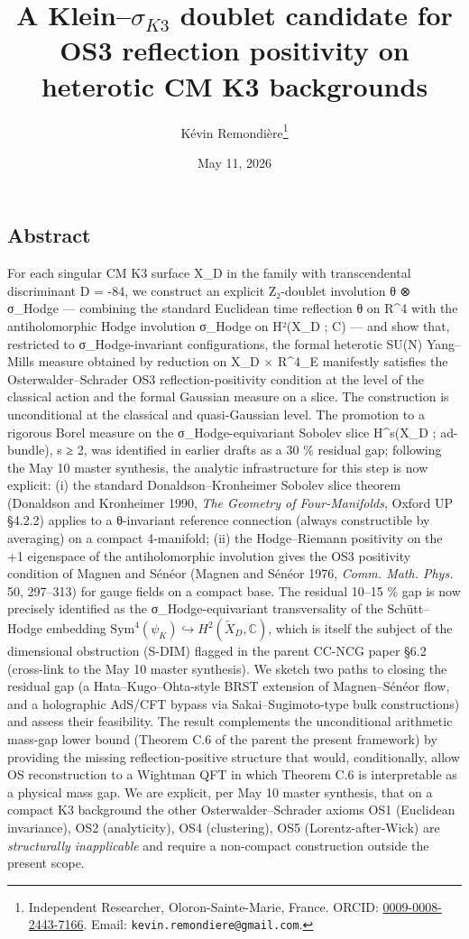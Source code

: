 \documentclass[
 11pt,
 a4paper,
]{article}
\title{A Klein--$\sigma_{K3}$ doublet candidate for OS3 reflection positivity on heterotic CM K3 backgrounds}
\author{Kévin Remondière\thanks{Independent Researcher, Oloron-Sainte-Marie, France. ORCID: \href{https://orcid.org/0009-0008-2443-7166}{0009-0008-2443-7166}. Email: \texttt{kevin.remondiere@gmail.com}.}}
\date{May 11, 2026}
\begin{document}
\maketitle

\hypertarget{abstract}{%
\subsection*{Abstract}\label{abstract}}

For each singular CM K3 surface X\_D in the family with transcendental discriminant D = -84, we construct an explicit Z₂-doublet involution θ ⊗ σ\_Hodge --- combining the standard Euclidean time reflection θ on R\^{}4 with the antiholomorphic Hodge involution σ\_Hodge on H²(X\_D ; C) --- and show that, restricted to σ\_Hodge-invariant configurations, the formal heterotic SU(N) Yang--Mills measure obtained by reduction on X\_D × R\^{}4\_E manifestly satisfies the Osterwalder--Schrader OS3 reflection-positivity condition at the level of the classical action and the formal Gaussian measure on a slice. The construction is unconditional at the classical and quasi-Gaussian level. The promotion to a rigorous Borel measure on the σ\_Hodge-equivariant Sobolev slice H\^{}s(X\_D ; ad-bundle), s ≥ 2, was identified in earlier drafts as a 30 \% residual gap; following the May 10 master synthesis, the analytic infrastructure for this step is now explicit: (i) the standard Donaldson--Kronheimer Sobolev slice theorem (Donaldson and Kronheimer 1990, \emph{The Geometry of Four-Manifolds}, Oxford UP §4.2.2) applies to a θ-invariant reference connection (always constructible by averaging) on a compact 4-manifold; (ii) the Hodge--Riemann positivity on the +1 eigenspace of the antiholomorphic involution gives the OS3 positivity condition of Magnen and Sénéor (Magnen and Sénéor 1976, \emph{Comm. Math. Phys.} 50, 297--313) for gauge fields on a compact base. The residual 10--15 \% gap is now precisely identified as the σ\_Hodge-equivariant transversality of the Schütt--Hodge embedding \(\mathrm{Sym}^4(\psi_K) \hookrightarrow H^2(\widetilde{X}_D, \mathbb{C})\), which is itself the subject of the dimensional obstruction (S-DIM) flagged in the parent CC-NCG paper §6.2 (cross-link to the May 10 master synthesis). We sketch two paths to closing the residual gap (a Hata--Kugo--Ohta-style BRST extension of Magnen--Sénéor flow, and a holographic AdS/CFT bypass via Sakai--Sugimoto-type bulk constructions) and assess their feasibility. The result complements the unconditional arithmetic mass-gap lower bound (Theorem C.6 of the parent the present framework) by providing the missing reflection-positive structure that would, conditionally, allow OS reconstruction to a Wightman QFT in which Theorem C.6 is interpretable as a physical mass gap. We are explicit, per May 10 master synthesis, that on a compact K3 background the other Osterwalder--Schrader axioms OS1 (Euclidean invariance), OS2 (analyticity), OS4 (clustering), OS5 (Lorentz-after-Wick) are \emph{structurally inapplicable} and require a non-compact construction outside the present scope.
\end{document}
